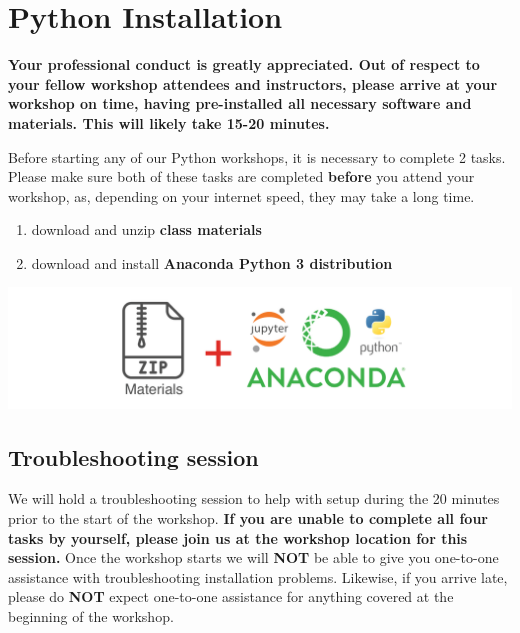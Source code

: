 \documentclass[
]{book}
\providecommand{\tightlist}{%
  \setlength{\itemsep}{0pt}\setlength{\parskip}{0pt}}
\begin{document}
\hypertarget{python-installation}{%
\chapter{Python Installation}\label{python-installation}}

\textbf{Your professional conduct is greatly appreciated. Out of respect to your fellow workshop attendees and instructors, please arrive at your workshop on time, having pre-installed all necessary software and materials. This will likely take 15-20 minutes.}

Before starting any of our Python workshops, it is necessary to complete 2 tasks. Please make sure both of these tasks are completed \textbf{before} you attend your workshop, as, depending on your internet speed, they may take a long time.

\begin{enumerate}
\def\labelenumi{\arabic{enumi}.}
\tightlist
\item
  download and unzip \textbf{class materials}
\item
  download and install \textbf{Anaconda Python 3 distribution}
\end{enumerate}

\includegraphics{Python/PythonInstall/images/install_software_Python.png}

\hypertarget{troubleshooting-session-1}{%
\section{Troubleshooting session}\label{troubleshooting-session-1}}

We will hold a troubleshooting session to help with setup during the 20 minutes prior to the start of the workshop.
\textbf{If you are unable to complete all four tasks by yourself, please join us at the workshop location for this session.}
Once the workshop starts we will \textbf{NOT} be able to give you one-to-one assistance with troubleshooting installation problems. Likewise, if you arrive late, please do \textbf{NOT} expect one-to-one assistance for anything covered at the beginning of the workshop.
\end{document}
